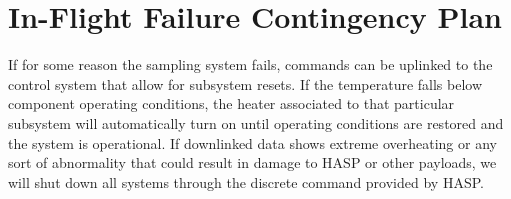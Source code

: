 \section{In-Flight Failure Contingency Plan}
\label{sec:Failure}
If for some reason the sampling system fails, commands can be uplinked to the control system that allow for subsystem resets. If the temperature falls below component operating conditions, the heater associated to that particular subsystem will automatically turn on until operating conditions are restored and the system is operational. If downlinked data shows extreme overheating or any sort of abnormality that could result in damage to HASP or other payloads, we will shut down all systems through the discrete command provided by HASP.

